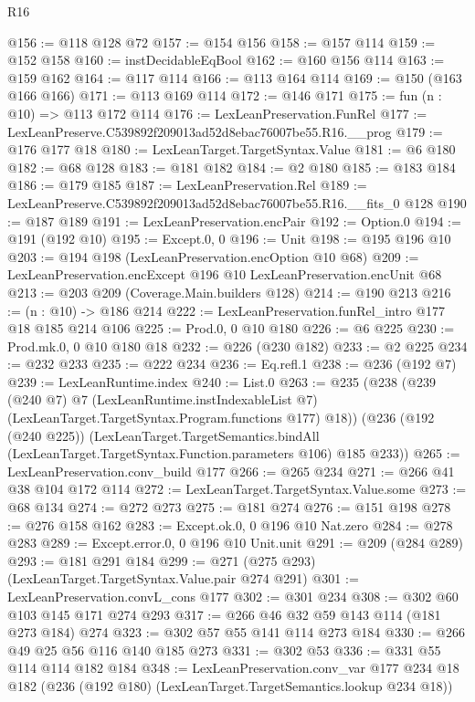 \begin{lexlean}{R16}
\begin{coremodule}
@156 := @118 @128 @72
@157 := @154 @156
@158 := @157 @114
@159 := @152 @158
@160 := instDecidableEqBool
@162 := @160 @156 @114
@163 := @159 @162
@164 := @117 @114
@166 := @113 @164 @114
@169 := @150 (@163 @166 @166)
@171 := @113 @169 @114
@172 := @146 @171
@175 := fun (n : @10) => @113 @172 @114
@176 := LexLeanPreservation.FunRel
@177 := LexLeanPreserve.C539892f209013ad52d8ebac76007be55.R16.__prog
@179 := @176 @177 @18
@180 := LexLeanTarget.TargetSyntax.Value
@181 := @6 @180
@182 := @68 @128
@183 := @181 @182
@184 := @2 @180
@185 := @183 @184
@186 := @179 @185
@187 := LexLeanPreservation.Rel
@189 := LexLeanPreserve.C539892f209013ad52d8ebac76007be55.R16.__fits_0 @128
@190 := @187 @189
@191 := LexLeanPreservation.encPair
@192 := Option.{0}
@194 := @191 (@192 @10)
@195 := Except.{0, 0}
@196 := Unit
@198 := @195 @196 @10
@203 := @194 @198 (LexLeanPreservation.encOption @10 @68)
@209 := LexLeanPreservation.encExcept @196 @10 LexLeanPreservation.encUnit @68
@213 := @203 @209 (Coverage.Main.builders @128)
@214 := @190 @213
@216 := (n : @10) -> @186 @214
@222 := LexLeanPreservation.funRel_intro @177 @18 @185 @214 @106
@225 := Prod.{0, 0} @10 @180
@226 := @6 @225
@230 := Prod.mk.{0, 0} @10 @180 @18
@232 := @226 (@230 @182)
@233 := @2 @225
@234 := @232 @233
@235 := @222 @234
@236 := Eq.refl.{1}
@238 := @236 (@192 @7)
@239 := LexLeanRuntime.index
@240 := List.{0}
@263 := @235
    (@238
      (@239
        (@240 @7)
        @7
        (LexLeanRuntime.instIndexableList @7)
        (LexLeanTarget.TargetSyntax.Program.functions @177)
        @18))
    (@236
      (@192 (@240 @225))
      (LexLeanTarget.TargetSemantics.bindAll
        (LexLeanTarget.TargetSyntax.Function.parameters @106)
        @185
        @233))
@265 := LexLeanPreservation.conv_build @177
@266 := @265 @234
@271 := @266 @41 @38 @104 @172 @114
@272 := LexLeanTarget.TargetSyntax.Value.some
@273 := @68 @134
@274 := @272 @273
@275 := @181 @274
@276 := @151 @198
@278 := @276 @158 @162
@283 := Except.ok.{0, 0} @196 @10 Nat.zero
@284 := @278 @283
@289 := Except.error.{0, 0} @196 @10 Unit.unit
@291 := @209 (@284 @289)
@293 := @181 @291 @184
@299 := @271 (@275 @293) (LexLeanTarget.TargetSyntax.Value.pair @274 @291)
@301 := LexLeanPreservation.convL_cons @177
@302 := @301 @234
@308 := @302 @60 @103 @145 @171 @274 @293
@317 := @266 @46 @32 @59 @143 @114 (@181 @273 @184) @274
@323 := @302 @57 @55 @141 @114 @273 @184
@330 := @266 @49 @25 @56 @116 @140 @185 @273
@331 := @302 @53
@336 := @331 @55 @114 @114 @182 @184
@348 := LexLeanPreservation.conv_var
    @177
    @234
    @18
    @182
    (@236 (@192 @180) (LexLeanTarget.TargetSemantics.lookup @234 @18))

\end{coremodule}
\end{lexlean}
